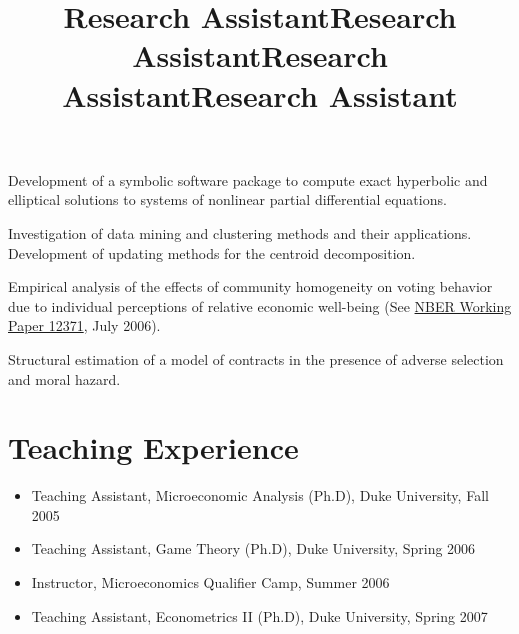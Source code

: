 \documentclass[overlapped,line,letterpaper]{res}
\begin{document}
\begin{resume}
\title{Research Assistant}
\begin{position}
  Development of a symbolic software package to compute exact
  hyperbolic and elliptical solutions to systems of nonlinear partial
  differential equations.
\end{position}

\title{Research Assistant}
\begin{position}
  Investigation of data mining and clustering methods and their
  applications. Development of updating methods for the centroid
  decomposition.
\end{position}

\title{Research Assistant}
\begin{position}
  Empirical analysis of the effects of community homogeneity on voting
  behavior due to individual perceptions of relative economic
  well-being
  (See \href{http://www.nber.org/papers/w12371}{NBER Working Paper 12371},
  July 2006).
\end{position}

\title{Research Assistant}
\begin{position}
  Structural estimation of a model of contracts in the presence of
  adverse selection and moral hazard.
\end{position}


\section{\bf Teaching Experience}

\begin{itemize}
\item Teaching Assistant, Microeconomic Analysis (Ph.D), Duke
  University, Fall 2005
\item Teaching Assistant, Game Theory (Ph.D), Duke University, Spring 2006
\item Instructor, Microeconomics Qualifier Camp, Summer 2006
\item Teaching Assistant, Econometrics II (Ph.D), Duke University, Spring 2007
\end{itemize}


\end{resume}
\end{document}
